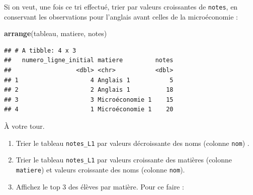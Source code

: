 \documentclass[
  11pt,
]{book}
\newcommand{\VERB}{\Verb[commandchars=\\\{\}]}
\newenvironment{Shaded}{\begin{snugshade}}{\end{snugshade}}
\newcommand{\FunctionTok}[1]{\textcolor[rgb]{0.13,0.29,0.53}{\textbf{#1}}}
\newcommand{\NormalTok}[1]{#1}
\providecommand{\tightlist}{%
  \setlength{\itemsep}{0pt}\setlength{\parskip}{0pt}}
\numberwithin{equation}{section}
\numberwithin{countremarque}{section}
\newenvironment{notebox}{
  \begin{tcolorbox}[breakable, colback=jaune,coltext=black,
                  colframe=grisfonce]}
 {\end{tcolorbox}}
\newenvironment{greenbox}{
  \begin{tcolorbox}[breakable, colback=vert,coltext=black,
                  colframe=grisfonce]}
 {\end{tcolorbox}}
\begin{document}
\begin{notebox}
Si on veut, une fois ce tri effectué, trier par valeurs croissantes de \texttt{notes}, en conservant les observations pour l'anglais avant celles de la microéconomie :

\begin{Shaded}
\begin{Highlighting}[]
\FunctionTok{arrange}\NormalTok{(tableau, matiere, notes)}
\end{Highlighting}
\end{Shaded}

\begin{lstlisting}
## # A tibble: 4 x 3
##   numero_ligne_initial matiere         notes
##                  <dbl> <chr>           <dbl>
## 1                    4 Anglais 1           5
## 2                    2 Anglais 1          18
## 3                    3 Microéconomie 1    15
## 4                    1 Microéconomie 1    20
\end{lstlisting}

\end{notebox}

\begin{greenbox}

À votre tour.

\begin{enumerate}
\def\labelenumi{\arabic{enumi}.}
\tightlist
\item
  Trier le tableau \texttt{notes\_L1} par valeurs décroissante des noms (colonne \texttt{nom}) .
\item
  Trier le tableau \texttt{notes\_L1} par valeurs croissante des matières (colonne \texttt{matiere}) et valeurs croissante des noms (colonne \texttt{nom}).
\item
  Affichez le top 3 des élèves par matière. Pour ce faire :
\end{enumerate}


\end{greenbox}
\end{document}

